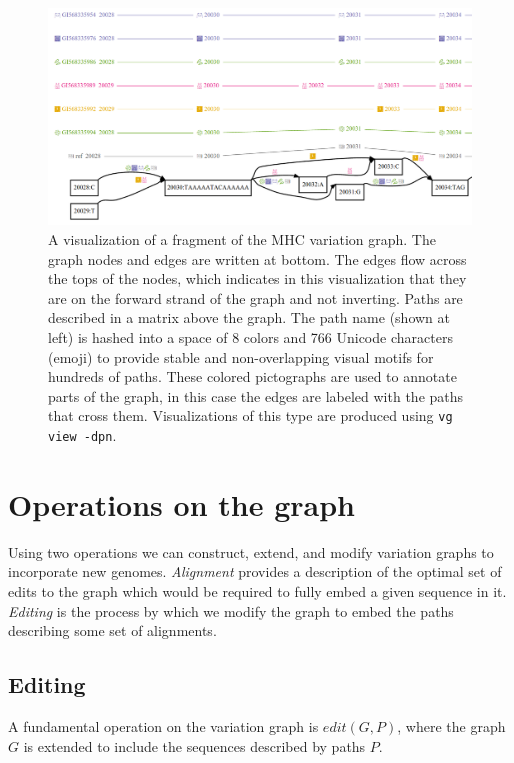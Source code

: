 \documentclass[12pt]{article}
\begin{document}
\begin{figure}[t]
\centering
\includegraphics[width=1.0\textwidth]{figures/minimhc}
\caption{\label{fig:minimhc}
  A visualization of a fragment of the MHC variation graph.
  The graph nodes and edges are written at bottom. The edges flow across the tops of the nodes, which indicates in this visualization that they are on the forward strand of the graph and not inverting.
  Paths are described in a matrix above the graph.
  The path name (shown at left) is hashed into a space of 8 colors and 766 Unicode characters (emoji) to provide stable and non-overlapping visual motifs for hundreds of paths.
  These colored pictographs are used to annotate parts of the graph, in this case the edges are labeled with the paths that cross them.
  Visualizations of this type are produced using {\tt vg view -dpn}.
}
\end{figure}

\section{Operations on the graph}

Using two operations we can construct, extend, and modify variation graphs to incorporate new genomes.
\emph{Alignment} provides a description of the optimal set of edits to the graph which would be required to fully embed a given sequence in it.
\emph{Editing} is the process by which we modify the graph to embed the paths describing some set of alignments.

\subsection{Editing}

A fundamental operation on the variation graph is $edit(G, P)$, where the graph $G$ is extended to include the sequences described by paths $P$.
\end{document}
